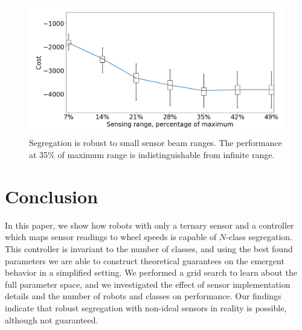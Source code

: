 \documentclass[letterpaper, 10 pt, conference]{ieeeconf}
\begin{document}
\begin{figure}[t]
  \centering
  \includegraphics[width=1\linewidth]{./images/beam_length.png}
  \caption{Segregation is robust to small sensor beam ranges. The performance at 35\% of maximum range is indistinguishable from infinite range.}
  \label{fig:beam_range}
\end{figure}

\section{Conclusion}

In this paper, we show how robots with only a ternary sensor and a controller
which maps sensor readings to wheel speeds is capable of $N$-class segregation.
This controller is invariant to the number of classes, and using the best found parameters
we are able to construct theoretical guarantees on the emergent behavior in a simplified setting.
We performed a grid search to learn about the full parameter space, and we
investigated the effect of sensor implementation details and the number of
robots and classes on performance. Our findings indicate that robust segregation
with non-ideal sensors in reality is possible, although not guaranteed.



\end{document}
